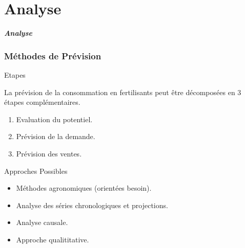 \documentclass{beamer}
\begin{document}
\section{Analyse}

\begin{frame}
	\begin{center}
		\Huge \textbf{\textit{Analyse}}
	\end{center}
\end{frame}

\begin{frame}
  \frametitle{Méthodes de Prévision}
  \begin{block}{Etapes}
  \small{La prévision de la consommation en fertilisants peut être décomposées en 3 étapes complémentaires.
  \begin{enumerate}
  \item Evaluation du potentiel.
  \item Prévision de la demande.
  \item Prévision des ventes.
  \end{enumerate}
  }\end{block}

	\begin{block}{Approches Possibles}
	\small{
	\begin{itemize}
	\item Méthodes agronomiques (orientées besoin).
	\item Analyse des séries chronologiques et projections.
	\item Analyse causale.
	\item Approche qualititative.
	\end{itemize}
	}
	\end{block}
\end{frame}
\end{document}
